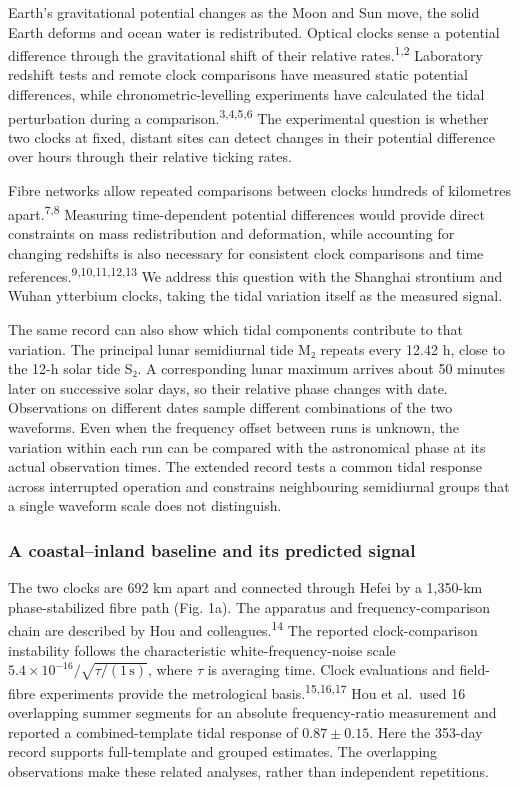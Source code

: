 \documentclass[
  12pt,
  a4paper,
]{article}
\begin{document}
\clearpage

Earth's gravitational potential changes as the Moon and Sun move, the
solid Earth deforms and ocean water is redistributed. Optical clocks
sense a potential difference through the gravitational shift of their
relative rates.\textsuperscript{1,2} Laboratory redshift tests and
remote clock comparisons have measured static potential differences,
while chronometric-levelling experiments have calculated the tidal
perturbation during a comparison.\textsuperscript{3,4,5,6} The
experimental question is whether two clocks at fixed, distant sites can
detect changes in their potential difference over hours through their
relative ticking rates.

Fibre networks allow repeated comparisons between clocks hundreds of
kilometres apart.\textsuperscript{7,8} Measuring time-dependent
potential differences would provide direct constraints on mass
redistribution and deformation, while accounting for changing redshifts
is also necessary for consistent clock comparisons and time
references.\textsuperscript{9,10,11,12,13} We address this question with
the Shanghai strontium and Wuhan ytterbium clocks, taking the tidal
variation itself as the measured signal.

The same record can also show which tidal components contribute to that
variation. The principal lunar semidiurnal tide M₂ repeats every 12.42
h, close to the 12-h solar tide S₂. A corresponding lunar maximum
arrives about 50 minutes later on successive solar days, so their
relative phase changes with date. Observations on different dates sample
different combinations of the two waveforms. Even when the frequency
offset between runs is unknown, the variation within each run can be
compared with the astronomical phase at its actual observation times.
The extended record tests a common tidal response across interrupted
operation and constrains neighbouring semidiurnal groups that a single
waveform scale does not distinguish.

\hypertarget{a-coastalinland-baseline-and-its-predicted-signal}{%
\subsubsection{A coastal--inland baseline and its predicted
signal}\label{a-coastalinland-baseline-and-its-predicted-signal}}

The two clocks are 692 km apart and connected through Hefei by a
1,350-km phase-stabilized fibre path (Fig. 1a). The apparatus and
frequency-comparison chain are described by Hou and
colleagues.\textsuperscript{14} The reported clock-comparison
instability follows the characteristic white-frequency-noise scale
\(5.4\times10^{-16}/\sqrt{\tau/(1\,\mathrm{s})}\), where \(\tau\) is
averaging time. Clock evaluations and field-fibre experiments provide
the metrological basis.\textsuperscript{15,16,17} Hou et al.~used 16
overlapping summer segments for an absolute frequency-ratio measurement
and reported a combined-template tidal response of \(0.87\pm0.15\). Here
the 353-day record supports full-template and grouped estimates. The
overlapping observations make these related analyses, rather than
independent repetitions.
\end{document}
